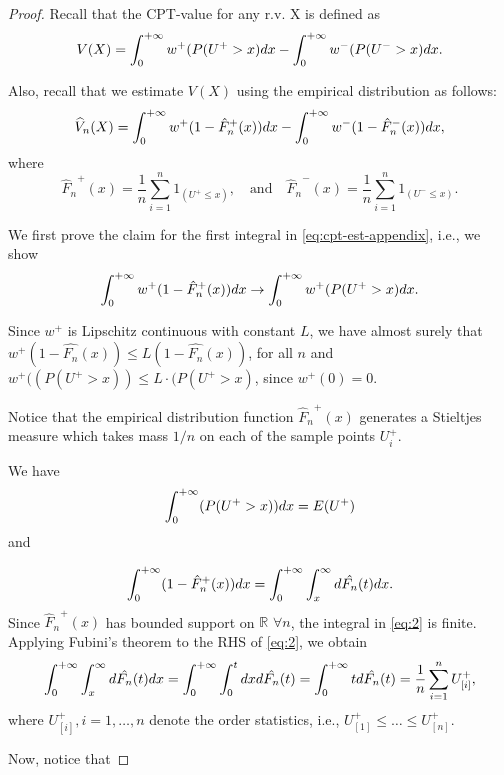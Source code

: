 \begin{proof}
Recall that the CPT-value for any r.v. X is defined as
\begin{align*}
V(X) = \int_0^{+\infty} w^+(P(U^+>x) dx - \int_0^{+\infty} w^-(P(U^->x) dx. 
\end{align*} 

Also, recall that we estimate $V(X)$ using the empirical distribution as follows:
\begin{align}
\label{eq:cpt-est-appendix}
\widehat V_n(X) = \int_0^{+\infty} w^+(1-{\hat F_n}^+(x))  dx - \int_0^{+\infty} w^-(1-{\hat F_n}^-(x))  dx,
\end{align}
where 
$$
{\hat F_n}^+(x)=\frac{1}{n} \sum_{i=1}^n 1_{(U^+ \leq x)}, \quad\text{and}\quad {\hat F_n}^-(x)=\frac{1}{n} \sum_{i=1}^n 1_{(U^- \leq x)}.
$$

We first prove the claim for the first integral in \eqref{eq:cpt-est-appendix}, i.e., we show
\begin{align}
\int_0^{+\infty} w^+(1-{\hat F_n}^+(x))  dx \rightarrow \int_0^{+\infty} w^+(P(U^+>x) dx.\label{eq:3}
\end{align} 

Since $w^+$ is Lipschitz continuous with constant $L$, we have almost surely that
$w^{+}(1-\hat{F_n}(x)) \leq L (1-\hat{F_n}(x))$,  
for all $n$ and 
 $w^{+}((P(U^+>x)) \leq L\cdot (P(U^+>x)$, since $w^+(0)=0$.
 
Notice that the empirical distribution function 
${\hat F_n}^+(x)$ 
generates a Stieltjes measure which takes mass 
$1/n$ on each of the sample points $U^+_i$. 

We have
$$\int_0^{+\infty} (P(U^+>x))  dx = E(U^+)$$
and

\begin{equation}
\int_0^{+\infty} (1-{\hat F_n}^+(x))  dx =\int_0^{+\infty} \int_x^\infty d \hat{F_n}(t) dx.\label{eq:2}
\end{equation}
Since ${\hat F_n}^+(x)$ has bounded support on $\mathbb{R}$ $\forall n$, the integral in \eqref{eq:2} is finite.
Applying Fubini's theorem to the RHS of \eqref{eq:2}, we obtain
\begin{equation}
\int_0^{+\infty} \int_x^\infty d \hat{F_n}(t) dx = \int_0^{+\infty} \int_0^t dx d \hat{F_n}(t) = \int_0^{+\infty} t d\hat{F_n}(t) = \frac{1}{n} \sum_{i=1}^n U^+_{[i]},
 \end{equation}
 where $U^+_{[i]}, i=1,\ldots,n$ denote the order statistics, i.e., $U^+_{[1]} \le \ldots \le U^+_{[n]}$.
 
Now, notice that 


\end{proof}
